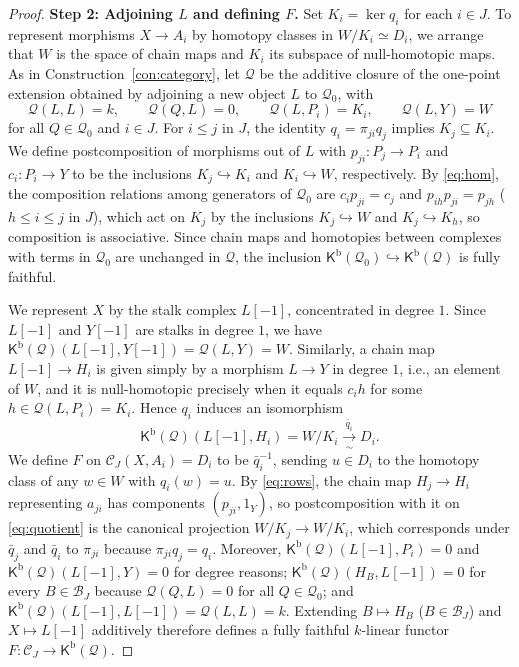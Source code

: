 \documentclass[a4paper,reqno,10pt]{amsart}
\numberwithin{equation}{section}
\theoremstyle{definition}
\newcommand{\B}{\mathcal B}
\newcommand{\C}{\mathcal C}
\newcommand{\Q}{\mathcal Q}
\newcommand{\Kb}{\mathsf K^{\mathrm b}}
\begin{document}
\begin{proof}
\medskip\noindent\textbf{Step 2: Adjoining $L$ and defining $F$.}
Set $K_i=\ker q_i$ for each $i\in J$. To represent morphisms $X\to A_i$ by
homotopy classes in $W/K_i\simeq D_i$, we arrange that $W$ is the space of
chain maps and $K_i$ its subspace of null-homotopic maps. As in
Construction~\ref{con:category}, let $\Q$ be the additive closure of the
one-point extension obtained by adjoining a new object $L$ to $\Q_0$, with
\[
  \Q(L,L)=k,\qquad \Q(Q,L)=0,\qquad \Q(L,P_i)=K_i,\qquad \Q(L,Y)=W
\]
for all $Q\in\Q_0$ and $i\in J$. For $i\le j$ in $J$, the identity
$q_i=\pi_{ji}q_j$ implies $K_j\subseteq K_i$. We define postcomposition of
morphisms out of $L$ with $p_{ji}:P_j\to P_i$ and $c_i:P_i\to Y$ to be the
inclusions $K_j\hookrightarrow K_i$ and $K_i\hookrightarrow W$, respectively.
By \eqref{eq:hom}, the composition relations among generators of $\Q_0$ are
$c_i p_{ji}=c_j$ and $p_{ih}p_{ji}=p_{jh}$ ($h\le i\le j$ in $J$), which act on
$K_j$ by the inclusions $K_j\hookrightarrow W$ and $K_j\hookrightarrow K_h$, so
composition is associative. Since chain maps and homotopies between complexes
with terms in $\Q_0$ are unchanged in $\Q$, the inclusion
$\Kb(\Q_0)\hookrightarrow\Kb(\Q)$ is fully faithful.

We represent $X$ by the stalk complex $L[-1]$, concentrated in degree $1$.
Since $L[-1]$ and $Y[-1]$ are stalks in degree $1$, we have
$\Kb(\Q)(L[-1],Y[-1])=\Q(L,Y)=W$. Similarly, a chain map $L[-1]\to H_i$ is
given simply by a morphism $L\to Y$ in degree $1$, i.e., an element of $W$, and
it is null-homotopic precisely when it equals $c_i h$ for some
$h\in\Q(L,P_i)=K_i$. Hence $q_i$ induces an isomorphism
\begin{equation}\label{eq:quotient}
    \Kb(\Q)(L[-1],H_i)=W/K_i\xrightarrow[\ \sim\ ]{\bar q_i} D_i .
\end{equation}
We define $F$ on $\C_J(X,A_i)=D_i$ to be $\bar q_i^{-1}$, sending $u\in D_i$ to
the homotopy class of any $w\in W$ with $q_i(w)=u$. By \eqref{eq:rows}, the
chain map $H_j\to H_i$ representing $a_{ji}$ has components $(p_{ji},1_Y)$, so
postcomposition with it on \eqref{eq:quotient} is the canonical projection
$W/K_j\to W/K_i$, which corresponds under $\bar q_j$ and $\bar q_i$ to
$\pi_{ji}$ because $\pi_{ji}q_j=q_i$. Moreover, $\Kb(\Q)(L[-1],P_i)=0$ and
$\Kb(\Q)(L[-1],Y)=0$ for degree reasons; $\Kb(\Q)(H_B,L[-1])=0$ for every
$B\in\B_J$ because $\Q(Q,L)=0$ for all $Q\in\Q_0$; and
$\Kb(\Q)(L[-1],L[-1])=\Q(L,L)=k$. Extending $B\mapsto H_B$ ($B\in\B_J$) and
$X\mapsto L[-1]$ additively therefore defines a fully faithful $k$-linear
functor $F:\C_J\to\Kb(\Q)$.


\end{proof}
\end{document}
